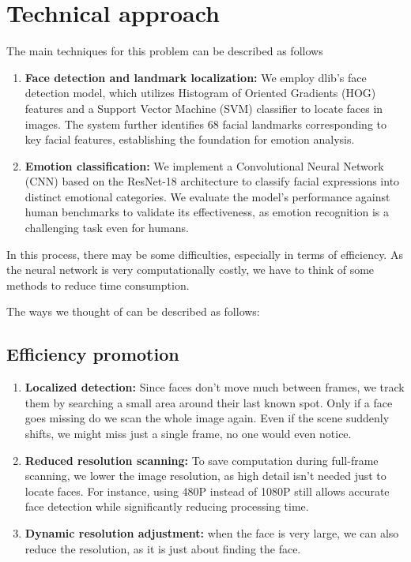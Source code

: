 \section{Technical approach}
The main techniques for this problem can be described as follows
\begin{enumerate}
		\item \textbf{Face detection and landmark localization:} We employ dlib's face detection model, which utilizes Histogram of Oriented Gradients (HOG) features and a Support Vector Machine (SVM) classifier to locate faces in images. The system further identifies 68 facial landmarks corresponding to key facial features, establishing the foundation for emotion analysis.
		\item \textbf{Emotion classification:} We implement a Convolutional Neural Network (CNN) based on the ResNet-18 architecture to classify facial expressions into distinct emotional categories. We evaluate the model's performance against human benchmarks to validate its effectiveness, as emotion recognition is a challenging task even for humans.
\end{enumerate}
In this process, there may be some difficulties, especially in terms of efficiency. As the neural network is very computationally costly, we have to think of some methods to reduce time consumption.

The ways we thought of can be described as follows:
\subsection{Efficiency promotion}
\begin{enumerate}
    \item \textbf{Localized detection:} Since faces don't move much between frames, we track them by searching a small area around their last known spot. Only if a face goes missing do we scan the whole image again. Even if the scene suddenly shifts, we might miss just a single frame, no one would even notice.
    \item \textbf{Reduced resolution scanning:} To save computation during full-frame scanning, we lower the image resolution, as high detail isn't needed just to locate faces. For instance, using 480P instead of 1080P still allows accurate face detection while significantly reducing processing time.
    \item \textbf{Dynamic resolution adjustment:} when the face is very large, we can also reduce the resolution, as it is just about finding the face.
\end{enumerate}
